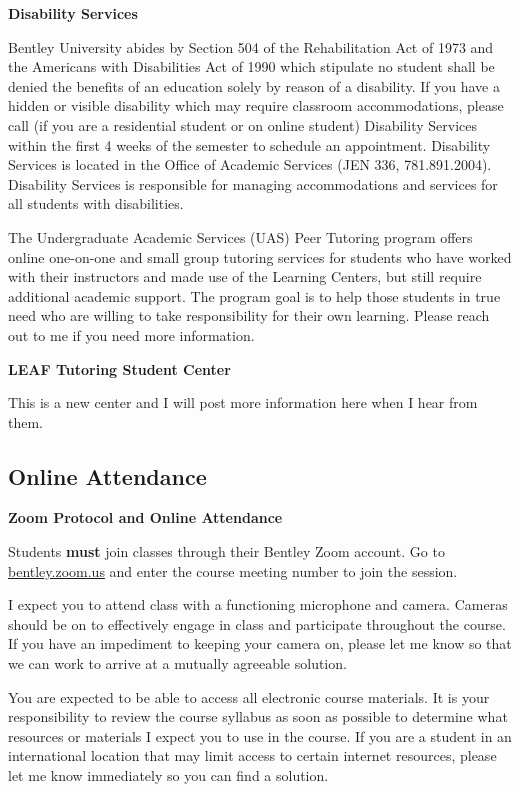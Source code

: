 \documentclass[
]{book}
\begin{document}
\textbf{Disability Services}

Bentley University abides by Section 504 of the Rehabilitation Act of 1973 and the Americans with Disabilities Act of 1990 which stipulate no student shall be denied the benefits of an education solely by reason of a disability. If you have a hidden or visible disability which may require classroom accommodations, please call (if you are a residential student or on online student) Disability Services within the first 4 weeks of the semester to schedule an appointment. Disability Services is located in the Office of Academic Services (JEN 336, 781.891.2004). Disability Services is responsible for managing accommodations and services for all students with disabilities.

The Undergraduate Academic Services (UAS) Peer Tutoring program offers online one-on-one and small group tutoring services for students who have worked with their instructors and made use of the Learning Centers, but still require additional academic support. The program goal is to help those students in true need who are willing to take responsibility for their own learning. Please reach out to me if you need more information.

\textbf{LEAF Tutoring Student Center}

This is a new center and I will post more information here when I hear from them.

\hypertarget{online-attendance}{%
\subsection*{Online Attendance}\label{online-attendance}}

\textbf{Zoom Protocol and Online Attendance}

Students \textbf{must} join classes through their Bentley Zoom account. Go to \href{https://bentley.zoom.us}{bentley.zoom.us} and enter the course meeting number to join the session.

I expect you to attend class with a functioning microphone and camera. Cameras should be on to effectively engage in class and participate throughout the course. If you have an impediment to keeping your camera on, please let me know so that we can work to arrive at a mutually agreeable solution.

You are expected to be able to access all electronic course materials. It is your responsibility to review the course syllabus as soon as possible to determine what resources or materials I expect you to use in the course. If you are a student in an international location that may limit access to certain internet resources, please let me know immediately so you can find a solution.
\end{document}
